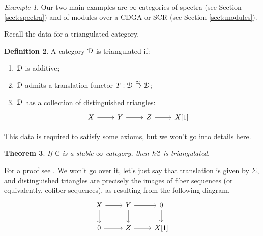 \documentclass[10pt,a4paper,reqno,oneside]{book} %
\theoremstyle{plain}
\newtheorem{thm}{Theorem}[section]
\theoremstyle{definition}
\newtheorem{defin}[thm]{Definition}
\theoremstyle{remark}
\newtheorem{eg}[thm]{Example}
\numberwithin{equation}{section}
\begin{document}
\begin{eg}
Our two main examples are $\infty$-categories of spectra (see Section \ref{sect:spectra}) and of modules over a CDGA or SCR
(see Section \ref{sect:modules}).
\end{eg}

Recall the data for a triangulated category.

\begin{defin}
A category $\mathcal D$ is triangulated if:
\begin{enumerate}
\item $\mathcal D$ is additive;
\item \label{item:translation_equiv}
 $\mathcal D$ admits a translation functor $T : \mathcal D \overset{\simeq}{\to} \mathcal D$;
\item $\mathcal D$ has a collection of distinguished triangles:
\[
\begin{tikzcd}
X\arrow{r} & Y \arrow{r} & Z \arrow{r} & X[1]
\end{tikzcd}
\]
\end{enumerate}
This data is required to satisfy some axioms, but we won't go into details here.
\end{defin}

\begin{thm}
\label{thm:stable_triang}
If $\mathcal C$ is a stable $\infty$-category, then $h\mathcal C$ is triangulated.
\end{thm}

For a proof see \cite{Lurie_Higher_algebra}. We won't go over it, let's just say that translation is given by $\Sigma$,
and distinguished triangles are precisely the images of fiber sequences (or equivalently, cofiber sequences), as resulting
from the following diagram.
\[
\begin{tikzcd}
X\arrow{r}\arrow{d} & Y \arrow{r}\arrow{d} & 0\arrow{d} \\
0\arrow{r} & Z \arrow{r} & X[1]
\end{tikzcd}
\]
\end{document}
